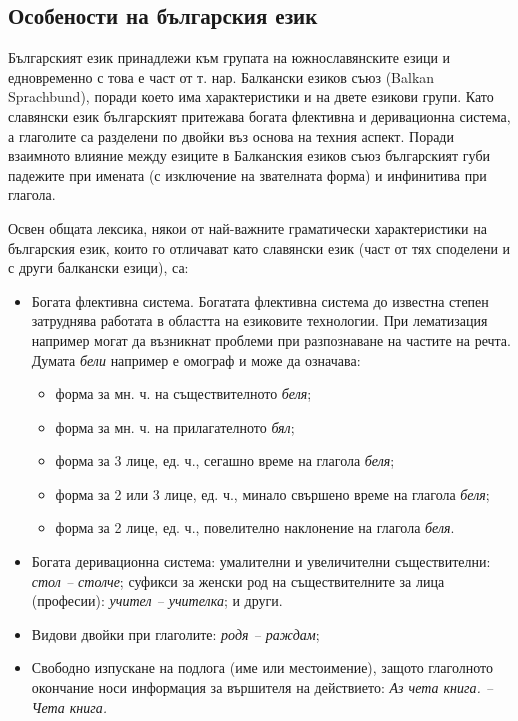 \begin{multicols}{2}
  \subsection{Особености на българския език}

  Българският език принадлежи към групата на южнославянските езици и едновременно с това е част от
   т. нар. Балкански езиков съюз (Balkan Sprachbund), поради което има характеристики и на двете езикови групи. Като славянски език българският притежава богата флективна и деривационна система, а глаголите са
   разделени по двойки въз основа на техния аспект. Поради взаимното влияние между езиците в Балканския езиков съюз българският губи падежите при
   имената (с изключение на звателната форма) и
   инфинитива при глагола.


  Освен общата лексика, някои от най-важните граматически характеристики на българския език, които го отличават като славянски език (част от тях споделени и с други балкански езици), са:

  \begin{itemize}
  \item Богата флективна система. Богатата флективна система до известна степен затруднява работата в областта на
    езиковите технологии.  При лематизация например могат да възникнат
    проблеми при разпознаване на
    частите на речта. Думата \textit{бели} например е омограф и може да означава:

  \begin{itemize}
  \item форма за мн. ч. на съществителното \textit{беля};
  \item форма за мн. ч. на прилагателното \textit{бял};
  \item форма за 3 лице, ед. ч., сегашно време на глагола
   \textit{беля};
  \item форма за 2 или 3 лице, ед. ч., минало свършено време
   на глагола \textit{беля};
  \item форма за 2 лице, ед. ч., повелително наклонение на
   глагола \textit{беля}.
  \end{itemize}

  \item Богата деривационна система: умалителни и увеличителни съществителни: {\it стол -- столче}; суфикси
   за женски род на съществителните за лица (професии): {\it учител -- учителка}; и други.
  \item Видови двойки при глаголите: {\it родя -- раждам};
  \item Свободно изпускане на подлога (име или местоимение), защото глаголното окончание носи информация за вършителя на действието: \textit{Аз чета книга. -- Чета книга.}
  \end{itemize}


\end{multicols}
